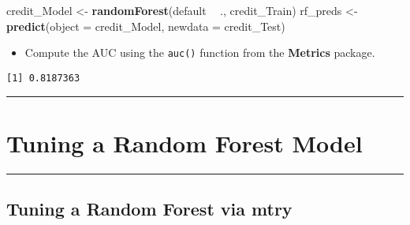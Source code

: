 \documentclass[
]{book}
\newenvironment{Shaded}{\begin{snugshade}}{\end{snugshade}}
\newcommand{\CommentTok}[1]{\textcolor[rgb]{0.56,0.35,0.01}{\textit{#1}}}
\newcommand{\DataTypeTok}[1]{\textcolor[rgb]{0.13,0.29,0.53}{#1}}
\newcommand{\DecValTok}[1]{\textcolor[rgb]{0.00,0.00,0.81}{#1}}
\newcommand{\KeywordTok}[1]{\textcolor[rgb]{0.13,0.29,0.53}{\textbf{#1}}}
\newcommand{\NormalTok}[1]{#1}
\newcommand{\OperatorTok}[1]{\textcolor[rgb]{0.81,0.36,0.00}{\textbf{#1}}}
\newcommand{\StringTok}[1]{\textcolor[rgb]{0.31,0.60,0.02}{#1}}
\providecommand{\tightlist}{%
  \setlength{\itemsep}{0pt}\setlength{\parskip}{0pt}}
\begin{document}
\begin{Shaded}
\begin{Highlighting}[]
\NormalTok{credit_Model <-}\StringTok{ }\KeywordTok{randomForest}\NormalTok{(default }\OperatorTok{~}\StringTok{ }\NormalTok{., }
\NormalTok{                             credit_Train)}
\NormalTok{rf_preds <-}\StringTok{ }\KeywordTok{predict}\NormalTok{(}\DataTypeTok{object =}\NormalTok{ credit_Model, }
                \DataTypeTok{newdata =}\NormalTok{ credit_Test)}
\end{Highlighting}
\end{Shaded}

\begin{itemize}
\tightlist
\item
  Compute the AUC using the \texttt{auc()} function from the \textbf{Metrics} package.
\end{itemize}

\begin{Shaded}
\end{Shaded}

\begin{verbatim}
[1] 0.8187363
\end{verbatim}

\begin{center}\rule{0.5\linewidth}{0.5pt}\end{center}

\hypertarget{tuning-a-random-forest-model}{%
\section{Tuning a Random Forest Model}\label{tuning-a-random-forest-model}}

\begin{center}\rule{0.5\linewidth}{0.5pt}\end{center}

\hypertarget{tuning-a-random-forest-via-mtry}{%
\subsection{Tuning a Random Forest via mtry}\label{tuning-a-random-forest-via-mtry}}
\end{document}
